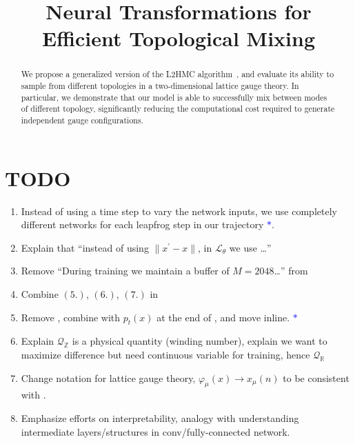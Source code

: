 \documentclass{article} %
\title{Neural Transformations for \\Efficient Topological Mixing}%
\author{Sam Foreman, Xiao-Yong Jin\& James Osborn\thanks{\hyperref{%
      https://github.com/saforem2/l2hmc-qcd
   }{https://github.com/saforem2/l2hmc-qcd} \\
   Leadership Computing Facility\\
   Argonne National Laboratory\\
   Lemont, IL 60439
   \texttt{\{foremans,xjin,\}@anl.gov},%
   \texttt{\{osborn\}@alcf.anl.gov}\\
}}
\begin{document}
\maketitle

\begin{abstract}
   We propose a generalized version of the L2HMC algorithm~\citep{levy2017}, and evaluate its ability to sample from
   different topologies in a two-dimensional lattice gauge theory.
   In particular, we demonstrate that our model is able to successfully mix between modes of different topology,
   significantly reducing the computational cost required to generate independent gauge configurations.
\end{abstract}

\section{TODO}
\begin{enumerate}
   \item Instead of using a time step to vary the network inputs, we use completely different networks for each leapfrog
      step in our trajectory \textcolor{blue}{\(\ast\)}. \marginpar{\textcolor{blue}{\(\ast\) WIP}}
   \item Explain that ``instead of using \(\|x^{\prime}-x\|\), in \(\mathcal{L}_{\theta}\) we use \ldots''
   \item Remove ``During training we maintain a buffer of \(M=2048\)\ldots'' from 
   \item Combine \((5.)\), \((6.)\), \((7.)\) in 
   \item Remove , combine with \(p_{t}(x)\) at the end of , and move
      inline. \textcolor{blue}{\(\ast\)}\marginpar{\textcolor{blue}{\(\ast\) WIP}}
   \item Explain \(\mathcal{Q}_{\mathbb{Z}}\) is a physical quantity (winding number), explain we want to maximize
      difference but need continuous variable for training, hence \(\mathcal{Q}_{\mathbb{R}}\)
   \item Change notation for lattice gauge theory, \(\varphi_{\mu}(x)\rightarrow x_{\mu}(n)\) to be consistent with
      .\marginpar{\textcolor{red}{\(\checkmark\) done}}
   \item Emphasize efforts on interpretability, analogy with understanding intermediate layers/structures in
      conv/fully-connected network.
\end{enumerate}
%
\end{document}
